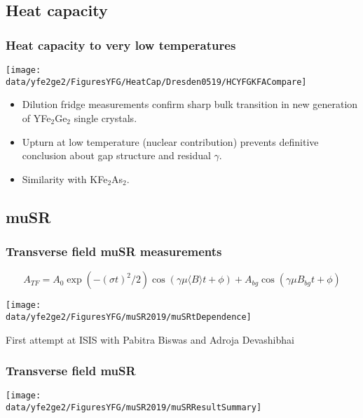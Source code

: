 \subsection{Heat capacity}
\begin{frame}[label=YFGHeatCapKFA]
\frametitle{Heat capacity to very low temperatures}

\centerline{\texttt{[image: \\data/yfe2ge2/FiguresYFG/HeatCap/Dresden0519/HCYFGKFACompare]}}
\begin{itemize}
\item
Dilution fridge measurements confirm sharp bulk transition in new
generation of YFe$_2$Ge$_2$ single crystals.
\item
Upturn at low temperature (nuclear contribution) prevents definitive
conclusion about gap structure and residual $\gamma$.
\item
Similarity with KFe$_2$As$_2$. 
\end{itemize}

\end{frame}


\subsection{muSR}
\begin{frame}[label=YFGmuSRIntro]
\frametitle{Transverse field muSR measurements}
\[
A_{TF} = A_0 \exp(-(\sigma t)^2/2) \cos\left(\gamma \mu
  \langle  B\rangle t+\phi\right )
+ A_{bg} \cos\left(\gamma \mu B_{bg} t + \phi \right)
\]
\centerline{\texttt{[image: \\data/yfe2ge2/FiguresYFG/muSR2019/muSRtDependence]}}
\centerline{First attempt at ISIS with Pabitra Biswas and Adroja Devashibhai}
\end{frame}


\begin{frame}[label=YFGmuSRSummary]
\frametitle{Transverse field muSR}

\centerline{\texttt{[image: \\data/yfe2ge2/FiguresYFG/muSR2019/muSRResultSummary]}}
\end{frame}

